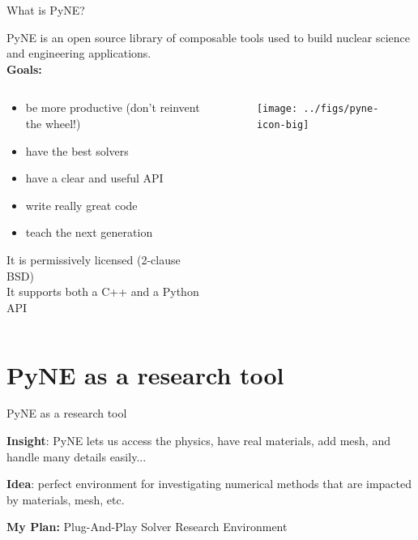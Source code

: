 \documentclass[xcolor=x11names,compress]{beamer}
\renewcommand{\(}{\begin{columns}}
\renewcommand{\)}{\end{columns}}
\newcommand{\<}[1]{\begin{column}{#1}}
\renewcommand{\>}{\end{column}}
\begin{document}
\begin{frame}{What is PyNE?}

    PyNE is an open source \alert{library of composable tools} used to build 
    nuclear science and engineering applications. \\
    \textbf{Goals:}
    
    \begin{columns}
    \begin{column}{0.45\textwidth}
        \begin{itemize}
        \item be more \alert{productive} (don't reinvent the wheel!)
        \item have the \alert{best solvers}
        \item have a clear and useful API
        \item write really \alert{great code}
        \item \alert{teach} the next generation
        \end{itemize}
    It is permissively licensed (2-clause BSD)\\
    \vspace{0.5 em}
    It supports both a \alert{C++} and a \textcolor{dgreen}{Python} API
  	\end{column}
 	\begin{column}{0.45\textwidth}
 	   \begin{center}
 	   \begin{figure}
       \texttt{[image: ../figs/pyne-icon-big]}
	   \end{figure}
 	   \end{center}
  	\end{column}
	\end{columns}

\end{frame}

\section{PyNE as a research tool}  
\begin{frame}{PyNE as a research tool}

    \textbf{Insight}: PyNE lets us access the physics, have real materials, 
    add mesh, and handle many details easily...

    \vspace{2 em}
    \textbf{Idea}: perfect environment for investigating numerical methods that 
    are impacted by materials, mesh, etc. 

    \vspace{2 em}
    \textbf{My Plan:} Plug-And-Play Solver Research Environment
    
\end{frame}
\end{document}
